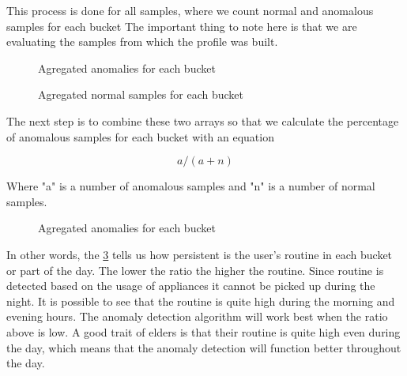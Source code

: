 This process is done for all samples, where we count normal and anomalous samples for each bucket
The important thing to note here is that we are evaluating the samples from which the profile was built.

\begin{figure}[H]
    \centering
    \caption{Agregated anomalies for each bucket}
    \label{arr:agg_anom}
\end{figure}

\begin{figure}[H]
    \centering
    \caption{Agregated normal samples for each bucket}
    \label{arr:agg_norm}
\end{figure}

The next step is to combine these two arrays so that we calculate the percentage of anomalous samples 
for each bucket with an equation

\begin{equation}
    a / (a + n) 
\end{equation}

Where "a" is a number of anomalous samples and "n" is a number of normal samples.

\begin{figure}[H]
    \centering
    \caption{Agregated anomalies for each bucket}
    \label{arr:anom_ratio}
\end{figure}

In other words, the \ref{arr:anom_ratio} tells us how persistent is the user's routine in each bucket or
part of the day. The lower the ratio the higher the routine. Since routine is detected based on the usage
of appliances it cannot be picked up during the night. It is possible to see that the routine is quite high 
during the morning and evening hours. The anomaly detection algorithm will work best when the ratio above is low.
A good trait of elders is that their routine is quite high even during the day, which means that
the anomaly detection will function better throughout the day.

